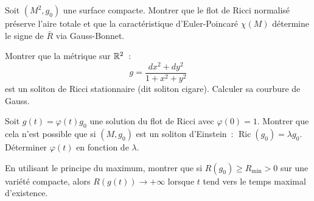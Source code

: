 \begin{exercice}
Soit $(M^2, g_0)$ une surface compacte. Montrer que le flot de Ricci normalis\'e
pr\'eserve l'aire totale et que la caract\'eristique d'Euler-Poincar\'e $\chi(M)$
d\'etermine le signe de $\bar{R}$ via Gauss-Bonnet.
\end{exercice}

\begin{exercice}
Montrer que la m\'etrique sur $\mathbb{R}^2$~:
\[
    g = \frac{dx^2 + dy^2}{1 + x^2 + y^2}
\]
est un soliton de Ricci stationnaire (dit \og{}soliton cigare\fg).
Calculer sa courbure de Gauss.
\end{exercice}

\begin{exercice}
Soit $g(t) = \varphi(t) g_0$ une solution du flot de Ricci avec $\varphi(0) = 1$.
Montrer que cela n'est possible que si $(M, g_0)$ est un soliton d'Einstein~:
$\operatorname{Ric}(g_0) = \lambda g_0$. D\'eterminer $\varphi(t)$ en fonction de
$\lambda$.
\end{exercice}

\begin{exercice}
En utilisant le principe du maximum, montrer que si $R(g_0) \geq R_{\min} > 0$
sur une vari\'et\'e compacte, alors $R(g(t)) \to +\infty$ lorsque $t$ tend vers
le temps maximal d'existence.
\end{exercice}
